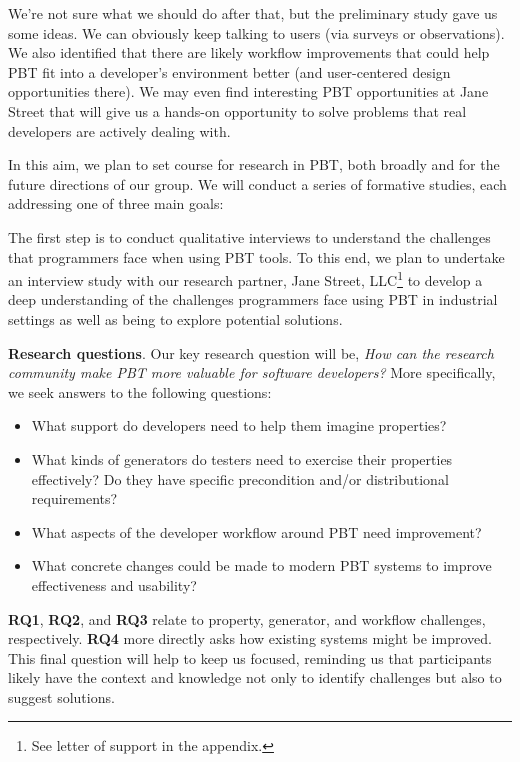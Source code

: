 We're not sure what we should do after that, but the preliminary study gave us some ideas. We can obviously keep talking to users (via surveys or observations). We also identified that there are likely workflow improvements that could help PBT fit into a developer’s environment better (and user-centered design opportunities there). We may even find interesting PBT opportunities at Jane Street that will give us a hands-on opportunity to solve problems that real developers are actively dealing with.

 In this aim, we plan to set course for research in PBT, both broadly and for the
future directions of our group. We will conduct a series of formative studies,
each addressing one of three main goals:


The first step is to conduct qualitative interviews to understand the challenges
that programmers face when using PBT tools. To this end, we plan to undertake an 
interview study with our research partner, Jane Street, LLC\footnote{See letter 
of support in the appendix.} to develop a deep understanding of the challenges 
programmers face using PBT in industrial settings as well as being to explore 
potential solutions.

\textbf{Research questions}.
Our key research question will be, \emph{How can the research community make PBT 
more valuable for software developers?} More specifically, we seek
answers to the following questions:

\begin{itemize}[noitemsep,leftmargin=4em]
\item[\bf RQ1.] What support do developers need to help them imagine properties? 
\item[\bf RQ2.] What kinds of generators do testers need to exercise their
  properties effectively? Do they have specific precondition and/or distributional
  requirements?
\item[\bf RQ3.] What aspects of the developer workflow around PBT need improvement?
\item[\bf RQ4.] What concrete changes could be made to modern PBT systems
  to improve effectiveness and usability?
\end{itemize}

{\bf RQ1}, {\bf RQ2}, and {\bf RQ3} relate to property,
generator, and workflow challenges, respectively.
{\bf RQ4} more directly asks how existing systems might
be improved. This final question will help to keep us focused,
reminding us that participants likely have the context and knowledge not
only to identify challenges but also to suggest
solutions.


